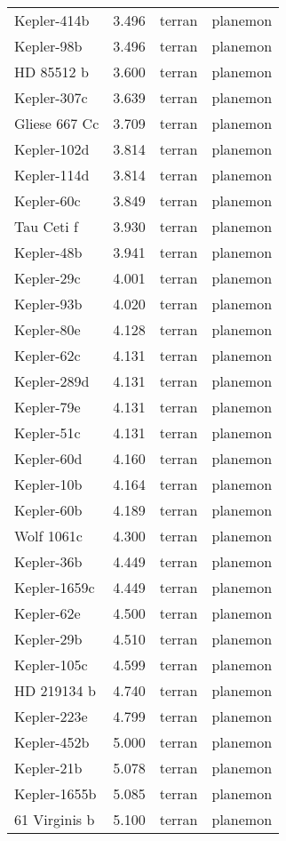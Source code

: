 \documentclass[
  letterpaper,
]{book}
\begin{document}
\begin{longtable}[]{@{}llll@{}}
Kepler-414b & 3.496 & terran & planemon \\
Kepler-98b & 3.496 & terran & planemon \\
HD 85512 b & 3.600 & terran & planemon \\
Kepler-307c & 3.639 & terran & planemon \\
Gliese 667 Cc & 3.709 & terran & planemon \\
Kepler-102d & 3.814 & terran & planemon \\
Kepler-114d & 3.814 & terran & planemon \\
Kepler-60c & 3.849 & terran & planemon \\
Tau Ceti f & 3.930 & terran & planemon \\
Kepler-48b & 3.941 & terran & planemon \\
Kepler-29c & 4.001 & terran & planemon \\
Kepler-93b & 4.020 & terran & planemon \\
Kepler-80e & 4.128 & terran & planemon \\
Kepler-62c & 4.131 & terran & planemon \\
Kepler-289d & 4.131 & terran & planemon \\
Kepler-79e & 4.131 & terran & planemon \\
Kepler-51c & 4.131 & terran & planemon \\
Kepler-60d & 4.160 & terran & planemon \\
Kepler-10b & 4.164 & terran & planemon \\
Kepler-60b & 4.189 & terran & planemon \\
Wolf 1061c & 4.300 & terran & planemon \\
Kepler-36b & 4.449 & terran & planemon \\
Kepler-1659c & 4.449 & terran & planemon \\
Kepler-62e & 4.500 & terran & planemon \\
Kepler-29b & 4.510 & terran & planemon \\
Kepler-105c & 4.599 & terran & planemon \\
HD 219134 b & 4.740 & terran & planemon \\
Kepler-223e & 4.799 & terran & planemon \\
Kepler-452b & 5.000 & terran & planemon \\
Kepler-21b & 5.078 & terran & planemon \\
Kepler-1655b & 5.085 & terran & planemon \\
61 Virginis b & 5.100 & terran & planemon \\

\end{longtable}
\end{document}
